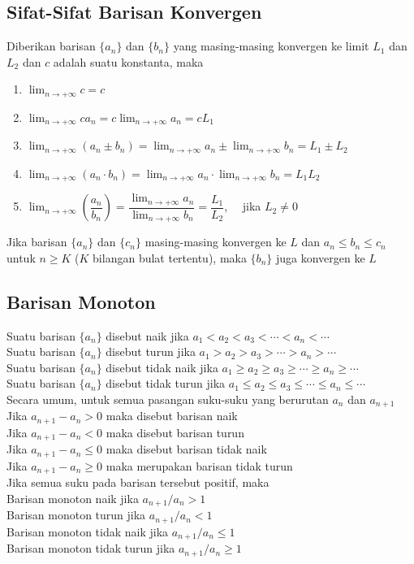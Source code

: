 \documentclass{article}
\begin{document}
\subsection{Sifat-Sifat Barisan Konvergen}
Diberikan barisan $\{a_n\}$ dan $\{b_n\}$ yang masing-masing konvergen ke limit $L_1$ dan $L_2$ dan $c$ adalah suatu konstanta, maka
\begin{enumerate}
	\item $\displaystyle \lim_{n\rightarrow +\infty} c = c$
	\item $\displaystyle \lim_{n\rightarrow +\infty} ca_n = c\lim_{n\rightarrow +\infty} a_n = cL_1$
	\item $\displaystyle \lim_{n\rightarrow +\infty} (a_n\pm b_n) = \lim_{n\rightarrow +\infty} a_n \pm \lim_{n\rightarrow +\infty} b_n = L_1\pm L_2$
	\item $\displaystyle \lim_{n\rightarrow +\infty} (a_n\cdot b_n) = \lim_{n\rightarrow +\infty} a_n \cdot \lim_{n\rightarrow +\infty} b_n = L_1L_2$
	\item $\displaystyle \lim_{n\rightarrow +\infty} \left(\dfrac{a_n}{b_n}\right) = \dfrac{\displaystyle\lim_{n\rightarrow +\infty} a_n}{\displaystyle\lim_{n\rightarrow +\infty} b_n} = \dfrac{L_1}{L_2}$, ~~jika $L_2\neq 0$
\end{enumerate}
Jika barisan $\{a_n\}$ dan $\{c_n\}$ masing-masing konvergen ke $L$ dan $a_n\leq b_n\leq c_n$ untuk $n\geq K$ ($K$ bilangan bulat tertentu), maka $\{b_n\}$ juga konvergen ke $L$
\subsection{Barisan Monoton}
Suatu barisan $\{a_n\}$ disebut naik jika $a_1<a_2<a_3<\cdots <a_n<\cdots$\\
Suatu barisan $\{a_n\}$ disebut turun jika $a_1>a_2>a_3>\cdots >a_n>\cdots$\\
Suatu barisan $\{a_n\}$ disebut tidak naik jika $a_1\geq a_2\geq a_3\geq \cdots \geq a_n\geq \cdots$\\
Suatu barisan $\{a_n\}$ disebut tidak turun jika $a_1\leq a_2\leq a_3\leq \cdots \leq a_n\leq \cdots$\\
Secara umum, untuk semua pasangan suku-suku yang berurutan $a_n$ dan $a_{n+1}$\\
Jika $a_{n+1}-a_n>0$ maka disebut barisan naik\\
Jika $a_{n+1}-a_n<0$ maka disebut barisan turun\\
Jika $a_{n+1}-a_n\leq 0$ maka disebut barisan tidak naik \\
Jika $a_{n+1}-a_n\geq 0$ maka merupakan barisan tidak turun\\
Jika semua suku pada barisan tersebut positif, maka \\
Barisan monoton naik jika $a_{n+1}/a_n>1$\\
Barisan monoton turun jika $a_{n+1}/a_n<1$\\
Barisan monoton tidak naik jika $a_{n+1}/a_n\leq 1$\\
Barisan monoton tidak turun jika $a_{n+1}/a_n\geq 1$
\end{document}
